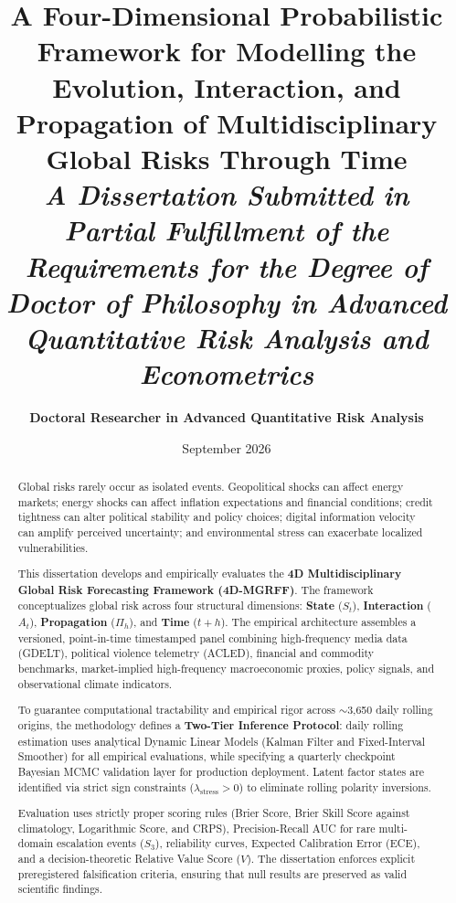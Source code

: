\documentclass[12pt,oneside,a4paper]{report}
\title{
    \vspace{-1.5in}
    \Huge \textbf{A Four-Dimensional Probabilistic Framework for Modelling the Evolution, Interaction, and Propagation of Multidisciplinary Global Risks Through Time} \\
    \vspace{0.8in}
    \large \textit{A Dissertation Submitted in Partial Fulfillment of the Requirements for the Degree of Doctor of Philosophy in Advanced Quantitative Risk Analysis and Econometrics} \\
    \vspace{0.8in}
}
\author{\textbf{Doctoral Researcher in Advanced Quantitative Risk Analysis}}
\date{September 2026}
\begin{document}
\maketitle

\begin{abstract}
Global risks rarely occur as isolated events. Geopolitical shocks can affect energy markets; energy shocks can affect inflation expectations and financial conditions; credit tightness can alter political stability and policy choices; digital information velocity can amplify perceived uncertainty; and environmental stress can exacerbate localized vulnerabilities. 

This dissertation develops and empirically evaluates the \textbf{4D Multidisciplinary Global Risk Forecasting Framework (4D-MGRFF)}. The framework conceptualizes global risk across four structural dimensions: \textbf{State} ($S_t$), \textbf{Interaction} ($A_t$), \textbf{Propagation} ($\Pi_h$), and \textbf{Time} ($t+h$). The empirical architecture assembles a versioned, point-in-time timestamped panel combining high-frequency media data (GDELT), political violence telemetry (ACLED), financial and commodity benchmarks, market-implied high-frequency macroeconomic proxies, policy signals, and observational climate indicators.

To guarantee computational tractability and empirical rigor across $\sim$3,650 daily rolling origins, the methodology defines a \textbf{Two-Tier Inference Protocol}: daily rolling estimation uses analytical Dynamic Linear Models (Kalman Filter and Fixed-Interval Smoother) for all empirical evaluations, while specifying a quarterly checkpoint Bayesian MCMC validation layer for production deployment. Latent factor states are identified via strict sign constraints ($\lambda_{\text{stress}} > 0$) to eliminate rolling polarity inversions.

Evaluation uses strictly proper scoring rules (Brier Score, Brier Skill Score against climatology, Logarithmic Score, and CRPS), Precision-Recall AUC for rare multi-domain escalation events ($S_3$), reliability curves, Expected Calibration Error (ECE), and a decision-theoretic Relative Value Score ($V$). The dissertation enforces explicit preregistered falsification criteria, ensuring that null results are preserved as valid scientific findings.
\end{abstract}

\tableofcontents
\listoffigures
\listoftables

\end{document}
